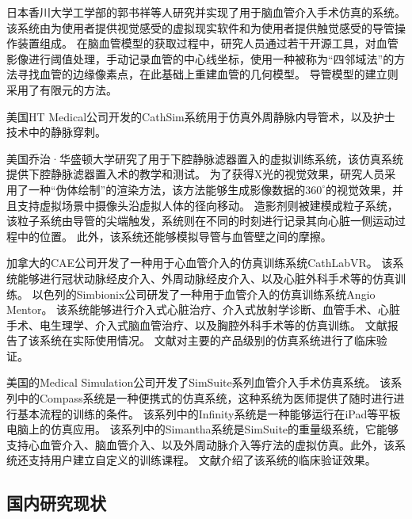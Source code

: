 日本香川大学工学部的郭书祥等人研究并实现了用于脑血管介入手术仿真的系统\cite{Gao2012aGUO}\cite{Gao2012bGUO}\cite{Gao2012cGUO}。
该系统由为使用者提供视觉感受的虚拟现实软件和为使用者提供触觉感受的导管操作装置组成\cite{Gao2012aGUO}。
在脑血管模型的获取过程中，研究人员通过若干开源工具，对血管影像进行阈值处理，手动记录血管的中心线坐标，使用一种被称为“四邻域法”的方法寻找血管的边缘像素点，在此基础上重建血管的几何模型\cite{Gao2012bGUO}。
导管模型的建立则采用了有限元的方法\cite{Gao2012cGUO}。

美国HT Medical公司开发的CathSim系统用于仿真外周静脉内导管术\cite{ursino1999cathsim}，以及护士技术中的静脉穿刺\cite{Barker1999CathSim}。

美国乔治·华盛顿大学研究了用于下腔静脉滤器置入的虚拟训练系统\cite{Hahn1998GWU}，该仿真系统提供下腔静脉滤器置入术的教学和测试。
为了获得X光的视觉效果，研究人员采用了一种“伪体绘制”的渲染方法\cite{Park1996GWU}，该方法能够生成影像数据的$360^\circ$的视觉效果，并且支持虚拟场景中摄像头沿虚拟人体的径向移动。
造影剂则被建模成粒子系统，该粒子系统由导管的尖端触发，系统则在不同的时刻进行记录其向心脏一侧运动过程中的位置\cite{Hahn1998GWU}。
此外，该系统还能够模拟导管与血管壁之间的摩擦\cite{Hahn1998GWU}。

加拿大的CAE公司开发了一种用于心血管介入的仿真训练系统CathLabVR\cite{caeweb}。
该系统能够进行冠状动脉经皮介入、外周动脉经皮介入、以及心脏外科手术等的仿真训练。
以色列的Simbionix公司研发了一种用于血管介入的仿真训练系统Angio Mentor\cite{simbionixweb}。
该系统能够进行介入式心脏治疗、介入式放射学诊断、血管手术、心脏手术、电生理学、介入式脑血管治疗、以及胸腔外科手术等的仿真训练。
文献\cite{hislop2009Simbionix}\cite{Lee2012Simbionix}报告了该系统在实际使用情况。
文献\cite{Petri2013Comparison}对主要的产品级别的仿真系统进行了临床验证。

美国的Medical Simulation公司开发了SimSuite\cite{simsuiteweb}系列血管介入手术仿真系统。
该系列中的Compass系统是一种便携式的仿真系统，这种系统为医师提供了随时进行进行基本流程的训练的条件。
该系列中的Infinity系统是一种能够运行在iPad等平板电脑上的仿真应用。
该系列中的Simantha系统是SimSuite的重量级系统，它能够支持心血管介入、脑血管介入、以及外周动脉介入等疗法的虚拟仿真。此外，该系统还支持用户建立自定义的训练课程。
文献\cite{Dawson2007SimSuite}介绍了该系统的临床验证效果。

\subsection{国内研究现状}
\label{sec1-3-2}

